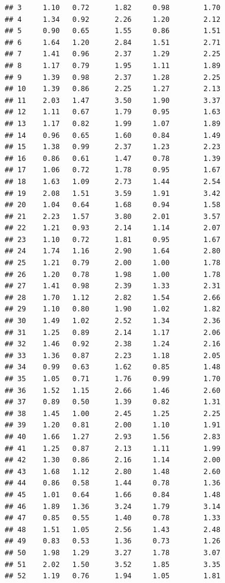 \documentclass[
]{book}
\theoremstyle{definition}
\theoremstyle{definition}
\theoremstyle{definition}
\theoremstyle{definition}
\theoremstyle{remark}
\begin{document}
\begin{verbatim}
## 3     1.10   0.72      1.82     0.98        1.70
## 4     1.34   0.92      2.26     1.20        2.12
## 5     0.90   0.65      1.55     0.86        1.51
## 6     1.64   1.20      2.84     1.51        2.71
## 7     1.41   0.96      2.37     1.29        2.25
## 8     1.17   0.79      1.95     1.11        1.89
## 9     1.39   0.98      2.37     1.28        2.25
## 10    1.39   0.86      2.25     1.27        2.13
## 11    2.03   1.47      3.50     1.90        3.37
## 12    1.11   0.67      1.79     0.95        1.63
## 13    1.17   0.82      1.99     1.07        1.89
## 14    0.96   0.65      1.60     0.84        1.49
## 15    1.38   0.99      2.37     1.23        2.23
## 16    0.86   0.61      1.47     0.78        1.39
## 17    1.06   0.72      1.78     0.95        1.67
## 18    1.63   1.09      2.73     1.44        2.54
## 19    2.08   1.51      3.59     1.91        3.42
## 20    1.04   0.64      1.68     0.94        1.58
## 21    2.23   1.57      3.80     2.01        3.57
## 22    1.21   0.93      2.14     1.14        2.07
## 23    1.10   0.72      1.81     0.95        1.67
## 24    1.74   1.16      2.90     1.64        2.80
## 25    1.21   0.79      2.00     1.00        1.78
## 26    1.20   0.78      1.98     1.00        1.78
## 27    1.41   0.98      2.39     1.33        2.31
## 28    1.70   1.12      2.82     1.54        2.66
## 29    1.10   0.80      1.90     1.02        1.82
## 30    1.49   1.02      2.52     1.34        2.36
## 31    1.25   0.89      2.14     1.17        2.06
## 32    1.46   0.92      2.38     1.24        2.16
## 33    1.36   0.87      2.23     1.18        2.05
## 34    0.99   0.63      1.62     0.85        1.48
## 35    1.05   0.71      1.76     0.99        1.70
## 36    1.52   1.15      2.66     1.46        2.60
## 37    0.89   0.50      1.39     0.82        1.31
## 38    1.45   1.00      2.45     1.25        2.25
## 39    1.20   0.81      2.00     1.10        1.91
## 40    1.66   1.27      2.93     1.56        2.83
## 41    1.25   0.87      2.13     1.11        1.99
## 42    1.30   0.86      2.16     1.14        2.00
## 43    1.68   1.12      2.80     1.48        2.60
## 44    0.86   0.58      1.44     0.78        1.36
## 45    1.01   0.64      1.66     0.84        1.48
## 46    1.89   1.36      3.24     1.79        3.14
## 47    0.85   0.55      1.40     0.78        1.33
## 48    1.51   1.05      2.56     1.43        2.48
## 49    0.83   0.53      1.36     0.73        1.26
## 50    1.98   1.29      3.27     1.78        3.07
## 51    2.02   1.50      3.52     1.85        3.35
## 52    1.19   0.76      1.94     1.05        1.81

\end{verbatim}
\end{document}
